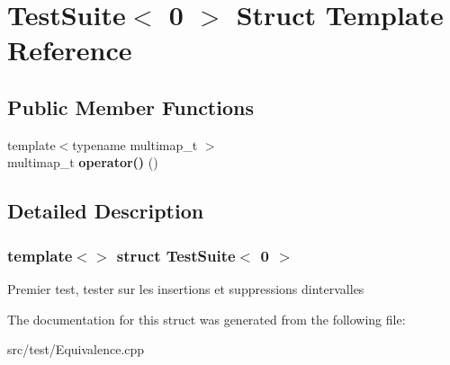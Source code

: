 \hypertarget{structTestSuite_3_010_01_4}{}\section{Test\+Suite$<$ 0 $>$ Struct Template Reference}
\label{structTestSuite_3_010_01_4}
\subsection*{Public Member Functions}
\begin{DoxyCompactItemize}
\item 
\mbox{\label{structTestSuite_3_010_01_4_a857db883aaf9f7f4248f0fb280b34798}} 
{\footnotesize template$<$typename multimap\+\_\+t $>$ }\\multimap\+\_\+t {\bfseries operator()} ()
\end{DoxyCompactItemize}


\subsection{Detailed Description}
\subsubsection*{template$<$$>$\newline
struct Test\+Suite$<$ 0 $>$}

Premier test, tester sur les insertions et suppressions d\textquotesingle{}intervalles 

The documentation for this struct was generated from the following file\+:\begin{DoxyCompactItemize}
\item 
src/test/Equivalence.\+cpp\end{DoxyCompactItemize}
